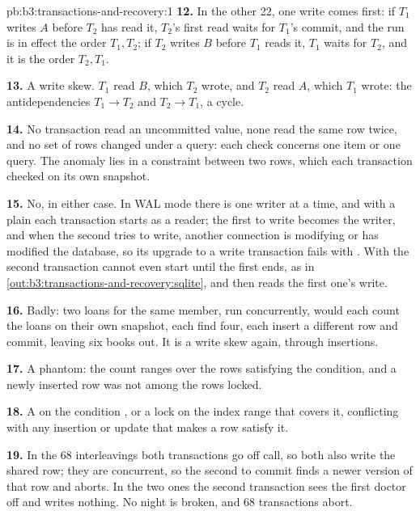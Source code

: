\begin{solution}{pb:b3:transactions-and-recovery:1}
\textbf{12.} In the other 22, one write comes first: if $T_1$ writes $A$ before $T_2$ has read it, $T_2$'s first read waits for $T_1$'s commit, and the run is in effect the  order $T_1, T_2$; if $T_2$ writes $B$ before $T_1$ reads it, $T_1$ waits for $T_2$, and it is the order $T_2, T_1$.

\textbf{13.} A write skew. $T_1$ read $B$, which $T_2$ wrote, and $T_2$ read $A$, which $T_1$ wrote: the antidependencies $T_1 \to T_2$ and $T_2 \to T_1$, a cycle.

\textbf{14.} No transaction read an uncommitted value, none read the same row twice, and no set of rows changed under a query: each check concerns one item or one query. The anomaly lies in a constraint between two rows, which each transaction checked on its own snapshot.

\textbf{15.} No, in either case. In WAL mode there is one writer at a time, and with a plain  each transaction starts as a reader; the first to write becomes the writer, and when the second tries to write, another connection is modifying or has modified the database, so its upgrade to a write transaction fails with . %
With  the second transaction cannot even start until the first ends, as in \cref{out:b3:transactions-and-recovery:sqlite}, and then reads the first one's write.

\textbf{16.} Badly: two loans for the same member, run concurrently, would each count the loans on their own snapshot, each find four, each insert a different row and commit, leaving six books out. It is a write skew again, through insertions.

\textbf{17.} A phantom: the count ranges over the rows satisfying the condition, and a newly inserted row was not among the rows locked.

\textbf{18.} A  on the condition , or a lock on the index range that covers it, conflicting with any insertion or update that makes a row satisfy it.

\textbf{19.} In the 68  interleavings both transactions go off call, so both also write the shared row; they are concurrent, so the second to commit finds a newer version of that row and aborts. In the two  ones the second transaction sees the first doctor off and writes nothing. No night is broken, and 68 transactions abort.


\end{solution}
